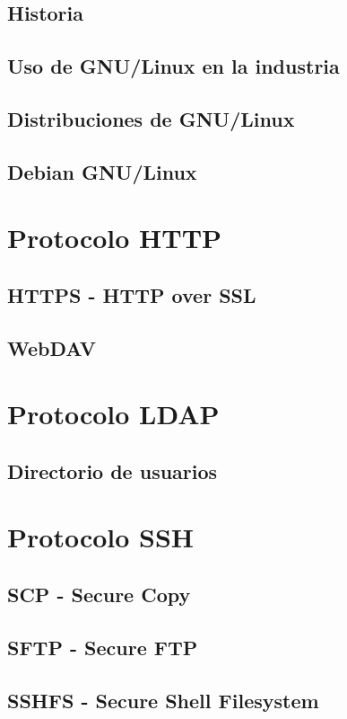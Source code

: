       \subsection {Historia}
      \subsection {Uso de GNU/Linux en la industria}
      \subsection {Distribuciones de GNU/Linux}
      \subsection {Debian GNU/Linux}
    \section {Protocolo HTTP}
      \subsection {HTTPS - HTTP over SSL}
      \subsection {WebDAV}
    \section {Protocolo LDAP}
      \subsection {Directorio de usuarios}
    \section {Protocolo SSH}
      \subsection {SCP - Secure Copy}
      \subsection {SFTP - Secure FTP}
      \subsection {SSHFS - Secure Shell Filesystem}
